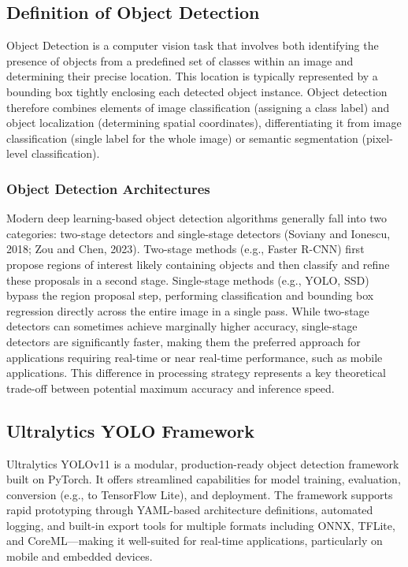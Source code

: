 \subsection{Definition of Object Detection}
Object Detection is a computer vision task that involves both identifying the presence of objects from a
predefined set of classes within an image and determining their precise location. This location is typically represented by a bounding box tightly enclosing each detected object instance. Object detection therefore
combines elements of image classification (assigning a class label) and object localization (determining spatial coordinates), differentiating it from image classification (single label for the whole image) or semantic
segmentation (pixel-level classification).

\subsubsection{Object Detection Architectures}
Modern deep learning-based object detection algorithms generally fall into two categories: two-stage detectors and single-stage detectors (Soviany and Ionescu, 2018; Zou and Chen, 2023). Two-stage methods
(e.g., Faster R-CNN) first propose regions of interest likely containing objects and then classify and refine
these proposals in a second stage. Single-stage methods (e.g., YOLO, SSD) bypass the region proposal
step, performing classification and bounding box regression directly across the entire image in a single pass.
While two-stage detectors can sometimes achieve marginally higher accuracy, single-stage detectors are significantly faster, making them the preferred approach for applications requiring real-time or near real-time
performance, such as mobile applications. This difference in processing strategy represents a key theoretical
trade-off between potential maximum accuracy and inference speed.

 \subsection{Ultralytics YOLO Framework}
Ultralytics YOLOv11 is a modular, production-ready object detection framework built on PyTorch. It offers streamlined capabilities for model training, evaluation, conversion (e.g., to TensorFlow Lite), and deployment. The framework supports rapid prototyping through YAML-based architecture definitions, automated logging, and built-in export tools for multiple formats including ONNX, TFLite, and CoreML—making it well-suited for real-time applications, particularly on mobile and embedded devices.

